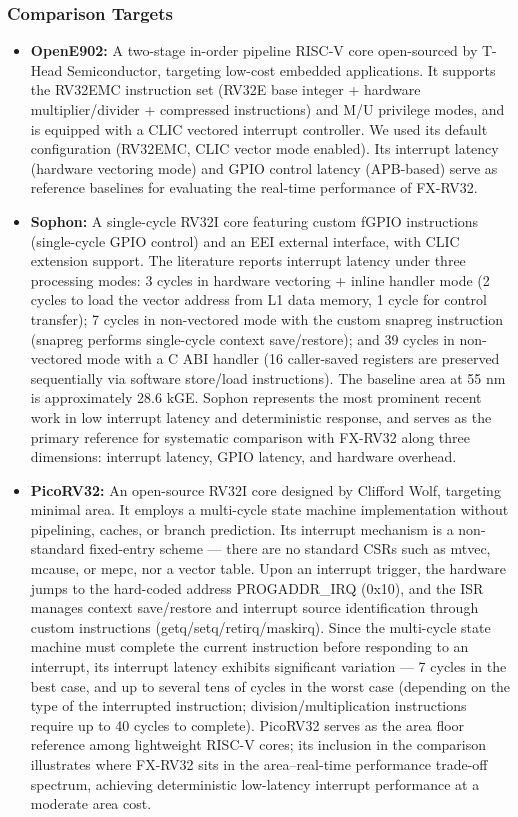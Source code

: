 \documentclass[letterpaper,journal]{IEEEtran}
\begin{document}
\subsubsection{Comparison Targets}
\begin{itemize}
\item \textbf{OpenE902:} A two-stage in-order pipeline RISC-V core open-sourced by T-Head Semiconductor, targeting low-cost embedded applications. It supports the RV32EMC instruction set (RV32E base integer + hardware multiplier/divider + compressed instructions) and M/U privilege modes, and is equipped with a CLIC vectored interrupt controller. We used its default configuration (RV32EMC, CLIC vector mode enabled). Its interrupt latency (hardware vectoring mode) and GPIO control latency (APB-based) serve as reference baselines for evaluating the real-time performance of FX-RV32.

\item \textbf{Sophon:} A single-cycle RV32I core featuring custom fGPIO instructions (single-cycle GPIO control) and an EEI external interface, with CLIC extension support. The literature reports interrupt latency under three processing modes: 3 cycles in hardware vectoring + inline handler mode (2 cycles to load the vector address from L1 data memory, 1 cycle for control transfer); 7 cycles in non-vectored mode with the custom snapreg instruction (snapreg performs single-cycle context save/restore); and 39 cycles in non-vectored mode with a C ABI handler (16 caller-saved registers are preserved sequentially via software store/load instructions). The baseline area at 55 nm is approximately 28.6 kGE. Sophon represents the most prominent recent work in low interrupt latency and deterministic response, and serves as the primary reference for systematic comparison with FX-RV32 along three dimensions: interrupt latency, GPIO latency, and hardware overhead.

\item \textbf{PicoRV32:} An open-source RV32I core designed by Clifford Wolf, targeting minimal area. It employs a multi-cycle state machine implementation without pipelining, caches, or branch prediction. Its interrupt mechanism is a non-standard fixed-entry scheme — there are no standard CSRs such as mtvec, mcause, or mepc, nor a vector table. Upon an interrupt trigger, the hardware jumps to the hard-coded address PROGADDR\_IRQ (0x10), and the ISR manages context save/restore and interrupt source identification through custom instructions (getq/setq/retirq/maskirq). Since the multi-cycle state machine must complete the current instruction before responding to an interrupt, its interrupt latency exhibits significant variation — 7 cycles in the best case, and up to several tens of cycles in the worst case (depending on the type of the interrupted instruction; division/multiplication instructions require up to 40 cycles to complete). PicoRV32 serves as the area floor reference among lightweight RISC-V cores; its inclusion in the comparison illustrates where FX-RV32 sits in the area–real-time performance trade-off spectrum, achieving deterministic low-latency interrupt performance at a moderate area cost.


\end{itemize}
\end{document}
